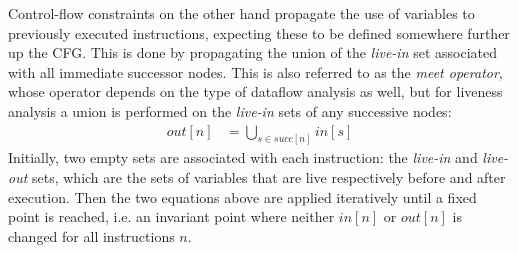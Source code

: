 \documentclass{article}
\begin{document}
Control-flow constraints on the other hand propagate the use of variables to previously executed instructions, expecting these to be defined somewhere further up the CFG. This is done by propagating the union of the \textit{live-in} set associated with all immediate successor nodes. This is also referred to as the \textit{meet operator}, whose operator depends on the type of dataflow analysis as well, but for liveness analysis a union is performed on the \textit{live-in} sets of  any successive  nodes:
\begin{align}\label{flowout}
  \mathit{out}\left[n\right] &= \bigcup_{s\in \mathit{succ}\left[n\right]} \mathit{in}\left[s\right]
\end{align}
Initially, two empty sets are associated with each instruction: the \textit{live-in} and \textit{live-out} sets, which are the sets of variables that are live respectively before and after execution. Then the two equations above are applied iteratively until a fixed point is reached, i.e. an invariant point where neither \(\mathit{in}[n]\) or \(\mathit{out}[n]\) is changed for all instructions \(n\).






\end{document}
